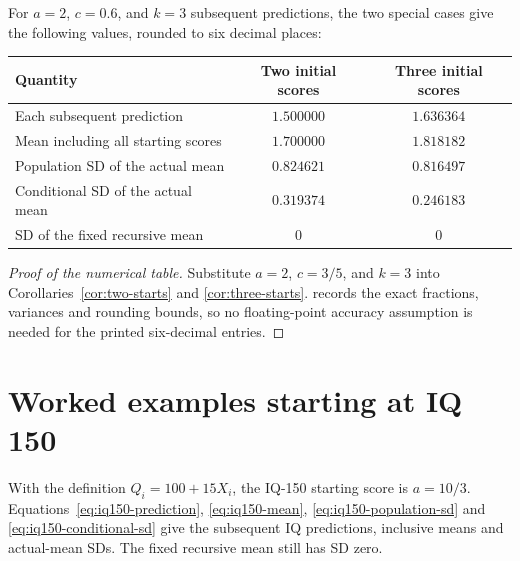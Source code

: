 For \(a=2\), \(c=0.6\), and \(k=3\) subsequent predictions, the two
special cases give the following values, rounded to six decimal places:
\begin{center}
\begin{tabular}{lcc}
\hline
Quantity & Two initial scores & Three initial scores \\
\hline
Each subsequent prediction & \(1.500000\) & \(1.636364\) \\
Mean including all starting scores & \(1.700000\) & \(1.818182\) \\
Population SD of the actual mean & \(0.824621\) & \(0.816497\) \\
Conditional SD of the actual mean & \(0.319374\) & \(0.246183\) \\
SD of the fixed recursive mean & \(0\) & \(0\) \\
\hline
\end{tabular}
\end{center}
\begin{proof}[Proof of the numerical table]
Substitute \(a=2\), \(c=3/5\), and \(k=3\) into
Corollaries~\ref{cor:two-starts} and \ref{cor:three-starts}.
 records the exact fractions, variances and
rounding bounds, so no floating-point accuracy assumption is needed for
the printed six-decimal entries.
\end{proof}

\chapter{Worked examples starting at IQ 150}
\label{sec:iq150-examples}

\begin{corollary}
\label{cor:iq-reporting}
With the definition \(Q_i=100+15X_i\), the IQ-150 starting score is
\(a=10/3\). Equations~\eqref{eq:iq150-prediction},
\eqref{eq:iq150-mean}, \eqref{eq:iq150-population-sd} and
\eqref{eq:iq150-conditional-sd} give the subsequent IQ predictions,
inclusive means and actual-mean SDs. The fixed recursive mean still has
SD zero.
\end{corollary}

